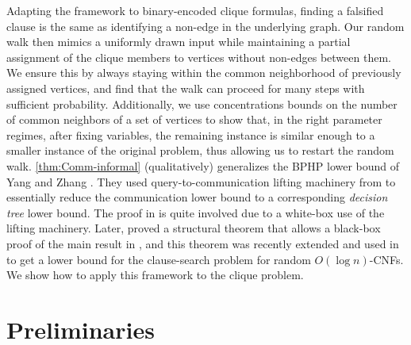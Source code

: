 Adapting the framework to binary-encoded clique formulas, finding a falsified clause is the same as identifying a non-edge in the underlying graph. 
Our random walk then mimics a uniformly drawn input while maintaining a partial assignment of the clique members to vertices without non-edges between them.
We ensure this by always staying within the common neighborhood of previously assigned vertices,
and find that the walk can proceed for many steps with sufficient probability. 
Additionally, we use concentrations bounds on the number of common neighbors of a set of vertices to show that, in the right parameter regimes,
after fixing variables, the remaining instance 
is similar enough to a smaller instance of the original problem, thus allowing us to restart the random walk. 
\cref{thm:Comm-informal} (qualitatively) generalizes the BPHP lower bound of Yang and Zhang \cite{YZ24Comm}. They used query-to-communication lifting machinery from \cite{GPW20} to essentially reduce the communication lower bound to a corresponding \emph{decision tree} lower bound. The proof in \cite{YZ24Comm} is quite involved due to a white-box use of the lifting machinery.
Later, \cite{GoosGJL2025quantum} proved a structural theorem that allows a black-box proof of the main result in \cite{YZ24Comm}, and this 
theorem was recently extended and used in \cite{RiazanovSSY2025searching} to get a lower bound for the clause-search problem for random $O(\log n)$-CNFs. 
We show how to apply this framework to the clique problem.

\section{Preliminaries}
\label{sec:preliminaries}

